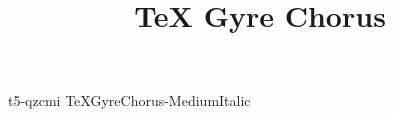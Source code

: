 \documentclass[test]{vnsample}
\title{TeX Gyre Chorus}
\begin{document}
\begin{shortsample}
    {t5-qzcmi}     {TeXGyreChorus-MediumItalic}
\end{shortsample}
\end{document}
